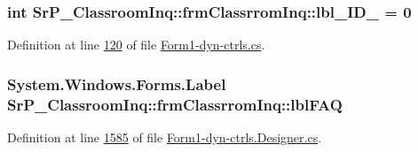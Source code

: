 \hypertarget{class_sr_p___classroom_inq_1_1frm_classrrom_inq_a5d14fbec9e02ebe6942d26ae8ed53d3b}{
\subsubsection[{lbl\-\_\-\-I\-D\-\_\-2}]{\setlength{\rightskip}{0pt plus 5cm}int {\bf \-Sr\-P\-\_\-\-Classroom\-Inq\-::frm\-Classrrom\-Inq\-::lbl\-\_\-\-I\-D\-\_} = 0}}
\label{class_sr_p___classroom_inq_1_1frm_classrrom_inq_a5d14fbec9e02ebe6942d26ae8ed53d3b}


\-Definition at line \hyperlink{_form1-dyn-ctrls_8cs_source_l00120}{120} of file \hyperlink{_form1-dyn-ctrls_8cs_source}{\-Form1-\/dyn-\/ctrls.\-cs}.

\hypertarget{class_sr_p___classroom_inq_1_1frm_classrrom_inq_ab8a84057dad27dc977240ce7f96187c3}{
\subsubsection[{lbl\-F\-A\-Q}]{\setlength{\rightskip}{0pt plus 5cm}\-System.\-Windows.\-Forms.\-Label {\bf \-Sr\-P\-\_\-\-Classroom\-Inq\-::frm\-Classrrom\-Inq\-::lbl\-F\-A\-Q}}}
\label{class_sr_p___classroom_inq_1_1frm_classrrom_inq_ab8a84057dad27dc977240ce7f96187c3}


\-Definition at line \hyperlink{_form1-dyn-ctrls_8_designer_8cs_source_l01585}{1585} of file \hyperlink{_form1-dyn-ctrls_8_designer_8cs_source}{\-Form1-\/dyn-\/ctrls.\-Designer.\-cs}.

